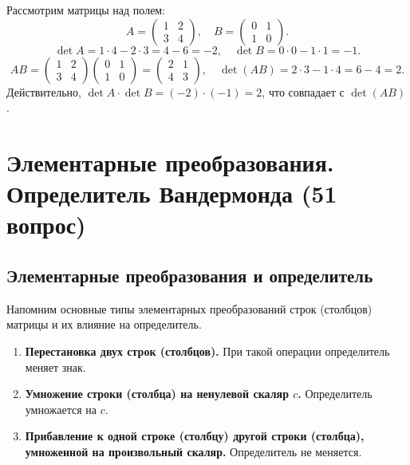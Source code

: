 \documentclass[a4paper,12pt]{article}
\theoremstyle{definition}
\theoremstyle{plain}
\theoremstyle{remark}
\begin{document}
	Рассмотрим матрицы над полем:
	\[
	A = \begin{pmatrix} 1 & 2 \\ 3 & 4 \end{pmatrix}, \quad B = \begin{pmatrix} 0 & 1 \\ 1 & 0 \end{pmatrix}.
	\]
	\[
	\det A = 1\cdot4 - 2\cdot3 = 4 - 6 = -2, \quad \det B = 0\cdot0 - 1\cdot1 = -1.
	\]
	\[
	AB = \begin{pmatrix} 1 & 2 \\ 3 & 4 \end{pmatrix} \begin{pmatrix} 0 & 1 \\ 1 & 0 \end{pmatrix} = \begin{pmatrix} 2 & 1 \\ 4 & 3 \end{pmatrix}, \quad \det(AB) = 2\cdot3 - 1\cdot4 = 6 - 4 = 2.
	\]
	Действительно, \( \det A \cdot \det B = (-2) \cdot (-1) = 2 \), что совпадает с \( \det(AB) \).
	
	
	
	
	\newpage
	\section{Элементарные преобразования. Определитель Вандермонда (51 вопрос)}
	
	\subsection{Элементарные преобразования и определитель}
	
	Напомним основные типы элементарных преобразований строк (столбцов) матрицы и их влияние на определитель.
	
	\begin{tcolorbox}[colback=blue!5, colframe=blue!40!black, title=Элементарные преобразования]
		\begin{enumerate}
			\item \textbf{Перестановка двух строк (столбцов).} При такой операции определитель меняет знак.
			\item \textbf{Умножение строки (столбца) на ненулевой скаляр \(c\).} Определитель умножается на \(c\).
			\item \textbf{Прибавление к одной строке (столбцу) другой строки (столбца), умноженной на произвольный скаляр.} Определитель не меняется.
		\end{enumerate}
	\end{tcolorbox}
	
\end{document}
